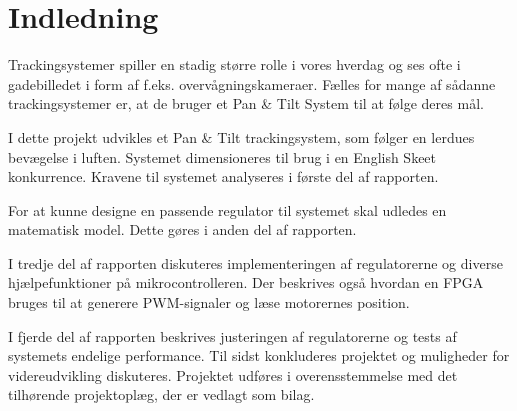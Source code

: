 \section*{Indledning}
Trackingsystemer spiller en stadig større rolle i vores hverdag og ses ofte i gadebilledet i form 
af f.eks. overvågningskameraer.
Fælles for mange af sådanne trackingsystemer er, at de bruger et Pan \& Tilt System til at følge deres mål. 

I dette projekt udvikles et Pan \& Tilt trackingsystem, som følger en lerdues bevægelse i 
luften. Systemet dimensioneres til brug i en English Skeet konkurrence. Kravene til systemet analyseres i første del af rapporten. 

For at kunne designe en passende regulator til systemet skal udledes en matematisk model. Dette gøres i anden del af rapporten. 

I tredje del af rapporten diskuteres implementeringen af regulatorerne og diverse hjælpefunktioner på mikrocontrolleren. Der beskrives også hvordan en FPGA bruges til at generere PWM-signaler og læse motorernes position. 

I fjerde del af rapporten beskrives justeringen af regulatorerne og tests af systemets endelige performance.
Til sidst konkluderes projektet og muligheder for videreudvikling diskuteres.
Projektet udføres i overensstemmelse med det tilhørende projektoplæg, der er vedlagt 
som bilag.
